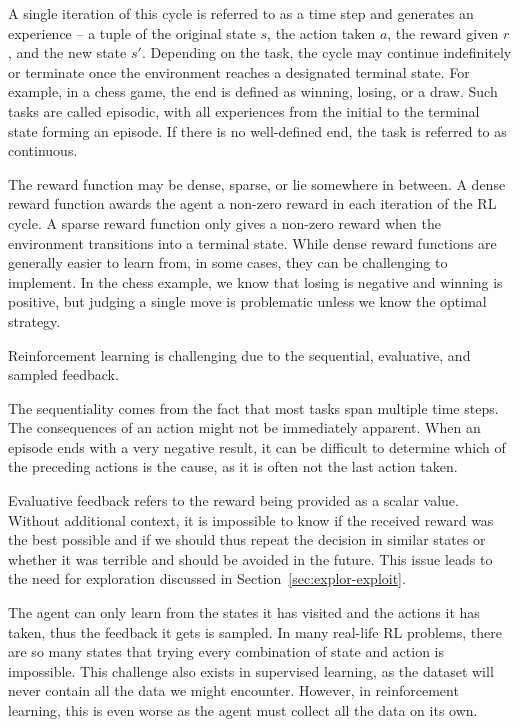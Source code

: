 \documentclass[
  digital,     %
  oneside,     %
  nosansbold,  %
  nocolorbold, %
  lof,         %
  lot,         %
]{fithesis4}
\begin{document}
A single iteration of this cycle is referred to as a time step and generates an experience -- a tuple of the original state $s$, the action taken $a$, the reward given $r$, and the new state $s'$. Depending on the task, the cycle may continue indefinitely or terminate once the environment reaches a designated terminal state. For example, in a chess game, the end is defined as winning, losing, or a draw. Such tasks are called episodic, with all experiences from the initial to the terminal state forming an episode. If there is no well-defined end, the task is referred to as continuous.

The reward function may be dense, sparse, or lie somewhere in between. A dense reward function awards the agent a non-zero reward in each iteration of the RL cycle. A sparse reward function only gives a non-zero reward when the environment transitions into a terminal state. While dense reward functions are generally easier to learn from, in some cases, they can be challenging to implement. In the chess example, we know that losing is negative and winning is positive, but judging a single move is problematic unless we know the optimal strategy.

Reinforcement learning is challenging due to the sequential, evaluative, and sampled feedback.

The sequentiality comes from the fact that most tasks span multiple time steps. The consequences of an action might not be immediately apparent. When an episode ends with a very negative result, it can be difficult to determine which of the preceding actions is the cause, as it is often not the last action taken.

Evaluative feedback refers to the reward being provided as a scalar value. Without additional context, it is impossible to know if the received reward was the best possible and if we should thus repeat the decision in similar states or whether it was terrible and should be avoided in the future. This issue leads to the need for exploration discussed in Section~\ref{sec:explor-exploit}.

The agent can only learn from the states it has visited and the actions it has taken, thus the feedback it gets is sampled. In many real-life RL problems, there are so many states that trying every combination of state and action is impossible. This challenge also exists in supervised learning, as the dataset will never contain all the data we might encounter. However, in reinforcement learning, this is even worse as the agent must collect all the data on its own.
\end{document}
